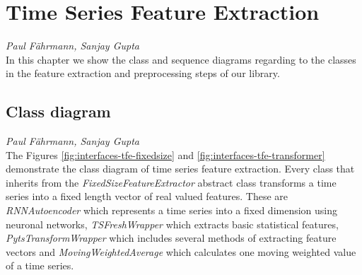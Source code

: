 \section{Time Series Feature Extraction}
\vspace*{-5mm}\hfill{\normalsize\emph{Paul Fährmann, Sanjay Gupta}}
\\
In this chapter we show the class and sequence diagrams regarding to the classes in the feature extraction and preprocessing steps of our library.
\subsection*{Class diagram}
\vspace*{-5mm}\hfill{\normalsize\emph{Paul Fährmann, Sanjay Gupta}}
\\
The Figures \ref{fig:interfaces-tfe-fixedsize} and \ref{fig:interfaces-tfe-transformer} demonstrate the class diagram of time series feature extraction. Every class that inherits from the \textit{FixedSizeFeatureExtractor} abstract class transforms a time series into a fixed length vector of real valued features. These are \textit{RNNAutoencoder} which represents a time series into a fixed dimension using neuronal networks, \textit{TSFreshWrapper} which extracts basic statistical features, \textit{PytsTransformWrapper} which includes several methods of extracting feature vectors and \textit{MovingWeightedAverage} which calculates one moving weighted value of a time series.

